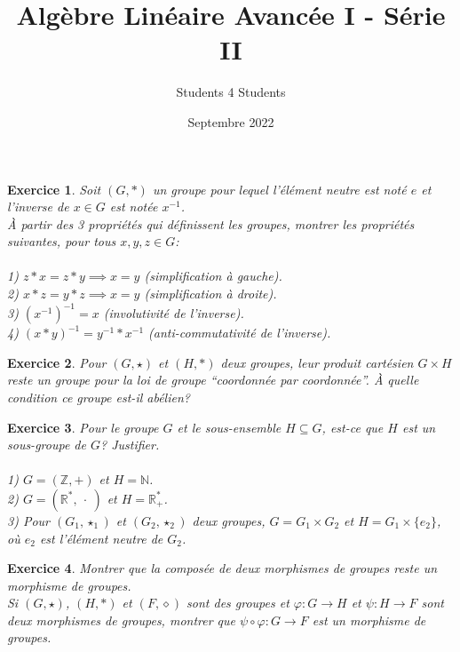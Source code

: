 \documentclass[11pt,french,table]{article}
\title{Algèbre Linéaire Avancée I - Série II}
\author{Students 4 Students}
\date{Septembre 2022}
\theoremstyle{exercice}
\newtheorem{exercice}{Exercice}
\newcommand{\R}{\mathbb{R}}
\newcommand{\Z}{\mathbb{Z}}
\newcommand{\N}{\mathbb{N}}
\begin{document}
\maketitle
\vspace{1em}
\begin{exercice}
Soit $(G,*)$ un groupe pour lequel l'élément neutre est noté $e$ et l'inverse de $x \in G$ est notée $x^{-1}$. \\
À partir des 3 propriétés qui définissent les groupes, montrer les propriétés suivantes, pour tous $x,y,z \in G$: \\
\\
1) $z * x = z * y \implies x = y$ (simplification à gauche). \\
2) $x*z =y*z \implies x = y$ (simplification à droite). \\
3) $\left( x^{-1} \right) ^{-1} = x$ (involutivité de l'inverse). \\
4) $(x * y) ^{-1} = y^{-1} * x^{-1}$ (anti-commutativité de l'inverse).
\end{exercice}
\vspace{2em}
\begin{exercice}
Pour $(G,\star)$ et $(H,*)$ deux groupes, leur produit cartésien $G \times H$ reste un groupe pour la loi de groupe ``coordonnée par coordonnée''. À quelle condition ce groupe est-il abélien?
\end{exercice}
\vspace{2em}
\begin{exercice}
Pour le groupe $G$ et le sous-ensemble $H \subseteq G$, est-ce que $H$ est un sous-groupe de $G$? Justifier. \\ \\
1) $G = (\Z,+)$ et $H = \N$. \\
2) $G = (\R^*, \ \cdot \ )$ et $H = \R_+^*$. \\
3) Pour $(G_1,\star_1)$ et $(G_2,\star_2)$ deux groupes, $G = G_1 \times G_2$ et $H = G_1 \times \{e_2\}$, où $e_2$ est l'élément neutre de $G_2$.
\end{exercice}
\vspace{2em}
\begin{exercice}
Montrer que la composée de deux morphismes de groupes reste un morphisme de groupes. \\
Si $(G,\star)$, $(H,*)$ et $(F,\diamond)$ sont des groupes et $\varphi : G \longrightarrow H$ et $\psi : H \longrightarrow F$ sont deux morphismes de groupes, montrer que $\psi \circ \varphi : G \longrightarrow F$ est un morphisme de groupes.
\end{exercice}
\end{document}
